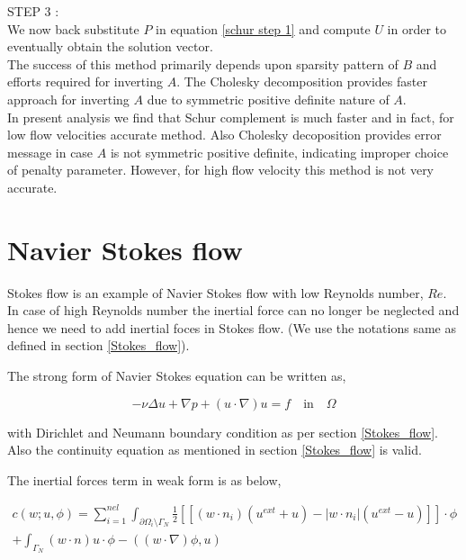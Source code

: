 \documentclass[a4paper,12pt]{book}
\begin{document}
STEP 3 : \\
We now back substitute $P$ in equation \eqref{schur step 1} and compute $U$ in order to eventually obtain the solution vector.
\\

The success of this method primarily depends upon sparsity pattern of $B$ and efforts required for inverting $A$. The Cholesky decomposition provides faster approach for inverting $A$ due to symmetric positive definite nature of $A$. \\

In present analysis we find that Schur complement is much faster and in fact, for low flow velocities accurate method. Also Cholesky decoposition provides error message in case $A$ is not symmetric positive definite, indicating improper choice of penalty parameter. However, for high flow velocity this method is not very accurate. 

\section{Navier Stokes flow}

Stokes flow is an example of Navier Stokes flow with low Reynolds number, $Re$. In case of high Reynolds number the inertial force can no longer be neglected and hence we need to add inertial foces in Stokes flow. (We use the notations same as defined in section \ref{Stokes_flow}).

The strong form of Navier Stokes equation can be written as,

\begin{equation} \label{navier_stokes_strong}
-\nu \Delta u + \nabla p + (u \cdot \nabla) u = f \quad \textrm{in} \quad \Omega
\end{equation}

with Dirichlet and Neumann boundary condition as per section \ref{Stokes_flow}. Also the continuity equation as mentioned in section \ref{Stokes_flow} is valid.

The inertial forces term in weak form is as below,

\begin{equation}
\begin{split}
c(w;u,\phi) = \sum_{i=1}^{nel} \int_{\partial \Omega_i \setminus \Gamma_N} \frac{1}{2} [[(w \cdot n_i)(u^{ext} + u) - |w \cdot n_i|(u^{ext} - u)]] \cdot \phi \\ + \int_{\Gamma_N} (w\cdot n) u \cdot \phi -((w\cdot \nabla)\phi,u)
\end{split}
\end{equation}
\end{document}
